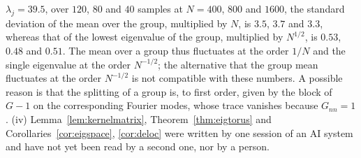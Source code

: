 \begin{remark}
$\lambda_j=39.5$, over $120$, $80$ and $40$ samples at $N=400$, $800$ and $1600$, the standard deviation of the mean over the group, multiplied by $N$, is $3.5$, $3.7$ and $3.3$, whereas that of the lowest eigenvalue of the group, multiplied by $N^{1/2}$, is $0.53$, $0.48$ and $0.51$. The mean over a group thus fluctuates at the order $1/N$ and the single eigenvalue at the order $N^{-1/2}$; the alternative that the group mean fluctuates at the order $N^{-1/2}$ is not compatible with these numbers. A possible reason is that the splitting of a group is, to first order, given by the block of $G-1$ on the corresponding Fourier modes, whose trace vanishes because $G_{nn}=1$. (iv) Lemma~\ref{lem:kernelmatrix}, Theorem~\ref{thm:eigtorus} and Corollaries~\ref{cor:eigspace}, \ref{cor:deloc} were written by one session of an AI system and have not yet been read by a second one, nor by a person.
\end{remark}

